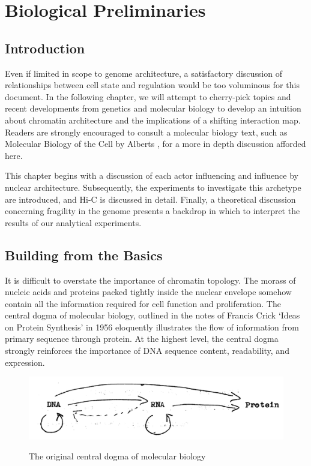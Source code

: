 
\chapter{Biological Preliminaries}

\section*{Introduction}

Even if limited in scope to genome architecture, a satisfactory discussion of relationships between cell state and regulation would
be too voluminous for this document.  In the following chapter, we will attempt to cherry-pick topics and recent
developments from genetics and molecular biology to develop an intuition about chromatin architecture and the implications
of a shifting interaction map.  Readers are strongly encouraged to consult a molecular biology text, such as Molecular Biology of the Cell by
Alberts \citep{alberts2002}, for a more in depth discussion afforded here.

This chapter begins with a discussion of each actor influencing and influence by nuclear architecture.  Subsequently, the experiments
to investigate this archetype are introduced, and Hi-C is discussed in detail.  Finally, a theoretical discussion concerning
fragility in the genome presents a backdrop in which to interpret the results of our analytical experiments.

\section*{Building from the Basics}

It is difficult to overstate the importance of chromatin topology.  The morass of nucleic acids and proteins packed tightly inside the
nuclear envelope somehow contain all the information required for cell function and proliferation.  The central dogma of molecular biology,
outlined in the notes of Francis Crick `Ideas on Protein Synthesis' in 1956 \citep{crick1970} eloquently illustrates the flow of
information from primary sequence through protein.  At the highest level, the central dogma strongly reinforces the importance of
\gls{DNA} sequence content, readability, and expression.

\begin{figure}[b]
  \centering
  \caption{The original central dogma of molecular biology \citep{crick1970}}
  \includegraphics[width=\textwidth]{figures/biology/dogma}\label{fig:dogma}
\end{figure}

